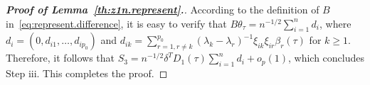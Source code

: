 \documentclass[times,sort&compress,3p]{elsarticle}
\theoremstyle{plain}%
\theoremstyle{definition}
\newcommand{\bD}{{D}}
\newcommand{\bB}{{B}}
\newcommand{\btheta}{{\theta}}
\newcommand{\bxi}{{\xi}}
\begin{document}
\begin{proof}[\textbf{\upshape Proof of Lemma~\ref{th:z1n.represent}.}]
	According to the definition of $B$ in~\eqref{eq:represent.difference}, it is easy to verify that $B \theta_{\tau} = n^{-1/2} \sum_{i = 1}^n d_i$, where ${d}_i = (0, d_{i1}, \ldots, d_{i p_0}) $ and 
	$d_{ik} = \sum_{r = 1, r \neq k}^{p_0} (\lambda_k - \lambda_r)^{-1} \xi_{ik} \xi_{ir} \beta_r(\tau)$ for $k \geq 1.$ Therefore, it follows that $S_3 = n^{-1/2} \delta^T D_1(\tau) \sum_{i = 1}^n d_i + o_p(1)$, which concludes Step iii. This completes the proof.  
\end{proof} 
	
\end{document}
